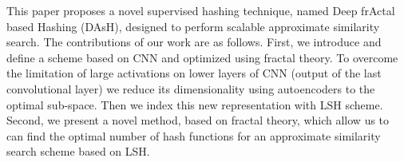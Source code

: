 \documentclass{article}
\begin{document}
     
 
 This paper proposes a novel supervised hashing technique,  named  Deep frActal based  Hashing (DAsH),  designed to perform scalable approximate similarity search. The contributions of our work are as follows. First,  we introduce and define a  scheme based on CNN and optimized using fractal theory. To overcome the limitation of large activations on lower layers of CNN (output of the last convolutional layer) we reduce its dimensionality using autoencoders  to the optimal sub-space. Then we index this new representation with LSH scheme.  Second, we present a novel method, based on fractal theory, which allow us to can find the optimal number of hash functions for an approximate similarity search scheme based on LSH.
 

 
  
  

  
 
\end{document}
